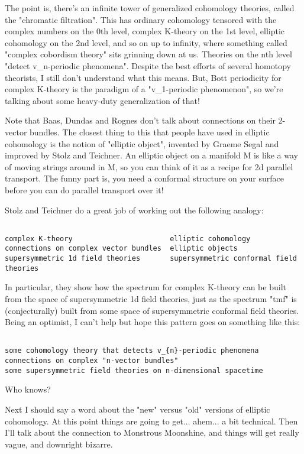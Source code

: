 The point is, there's an infinite tower of generalized cohomology
theories, called the "chromatic filtration".  This has ordinary 
cohomology tensored with the complex numbers on the 0th level, 
complex K-theory on the 1st level, elliptic cohomology on the 2nd 
level, and so on up to infinity, where something called "complex 
cobordism theory" sits grinning down at us.  Theories on the nth 
level "detect v_{n}-periodic phenomena".  
Despite the best efforts
of several homotopy theorists, I still don't understand what this
means.  But, Bott periodicity for complex K-theory is the paradigm 
of a "v_{1}-periodic 
phenomenon", so we're talking about some heavy-duty 
generalization of that!  

Note that Baas, Dundas and Rognes don't talk about connections 
on their 2-vector bundles.  The closest thing to this that
people have used in elliptic cohomology is the notion of
"elliptic object", invented by Graeme Segal and improved by
Stolz and Teichner.  An elliptic object on a manifold M is 
like a way of moving strings around in M, so you can think of 
it as a recipe for 2d parallel transport.  The funny part is, 
you need a conformal structure on your surface before you can 
do parallel transport over it!  

Stolz and Teichner do a great job of working out the following analogy:


\begin{verbatim}

complex K-theory                       elliptic cohomology
connections on complex vector bundles  elliptic objects
supersymmetric 1d field theories       supersymmetric conformal field theories
\end{verbatim}
    
In particular, they show how the spectrum for complex K-theory
can be built from the space of supersymmetric 1d field theories,
just as the spectrum "tmf" is (conjecturally) built from some
space of supersymmetric conformal field theories.  Being an
optimist, I can't help but hope this pattern goes on something like this:


\begin{verbatim}

some cohomology theory that detects v_{n}-periodic phenomena
connections on complex "n-vector bundles"
some supersymmetric field theories on n-dimensional spacetime
\end{verbatim}
    
Who knows?  

Next I should say a word about the "new" versus "old"
versions of elliptic cohomology.  At this
point things are going to get... ahem... a bit technical.
Then I'll talk about the connection to Monstrous Moonshine, and things will
get really vague, and downright bizarre.

